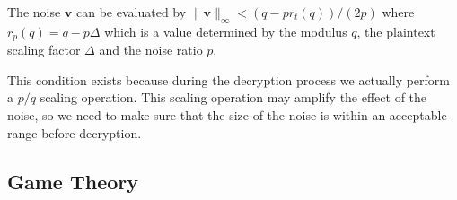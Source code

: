 \documentclass[11pt]{article}
\begin{document}
The noise $\mathbf{v}$ can be evaluated by $\lVert\mathbf{v}\rVert_\infty < (q-p r_t(q))/(2p)$ where $r_p(q)=q-p\Delta$ which is a value determined by the modulus $q$, the plaintext scaling factor $\Delta$ and the noise ratio $p$.

This condition exists because during the decryption process we actually perform a $p/q$ scaling operation. This scaling operation may amplify the effect of the noise, so we need to make sure that the size of the noise is within an acceptable range before decryption.


\subsection{Game Theory}
\end{document}
